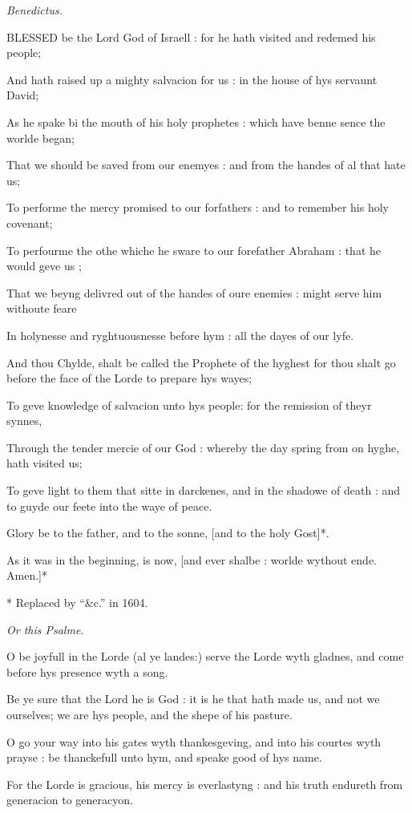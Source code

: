 \emph{}

\emph{Benedictus.}

BLESSED
be the Lord God of Israell : for he hath visited and redemed his people;

And hath raised up a mighty salvacion for us : in the
house of hys servaunt David;

As he spake bi the mouth of his holy prophetes : which
have benne sence the worlde began;

That we should be saved from our enemyes : and from
the handes of al that hate us;

To performe the mercy promised to our forfathers :
and to remember his holy covenant;

To perfourme the othe whiche he sware to our forefather
Abraham : that he would geve us ;

That we beyng delivred out of the handes of oure enemies
: might serve him withoute feare

In holynesse and ryghtuousnesse before hym : all the
dayes of our lyfe.

And thou Chylde, shalt be called the Prophete of the
hyghest for thou shalt go before the face of the Lorde to prepare hys
wayes;

To geve knowledge of salvacion unto hys people: for
the remission of theyr synnes,

Through the tender mercie of our God : whereby the
day spring from on hyghe, hath visited us;

To geve light to them that sitte in darckenes, and
in the shadowe of death : and to guyde our feete into the waye of peace.

Glory be to the father, and to the sonne, [and to the
holy Gost]*. 

As it was in the beginning, is now, [and ever shalbe
: worlde wythout ende. Amen.]*

*
Replaced by ``\&c.''
in 1604.

\emph{Or
this Psalme.}

O
be joyfull in the Lorde (al ye landes:) serve the Lorde wyth gladnes,
and come before hys presence wyth a song.

Be ye sure that the Lord he is God : it is he that
hath made us, and not we ourselves; we are hys people, and the shepe of
his pasture. 

O go your way into his gates wyth thankesgeving, and
into his courtes wyth prayse : be thanckefull unto hym, and speake good
of hys name.

For the Lorde is gracious, his mercy is everlastyng
: and his truth endureth from generacion to generacyon.

